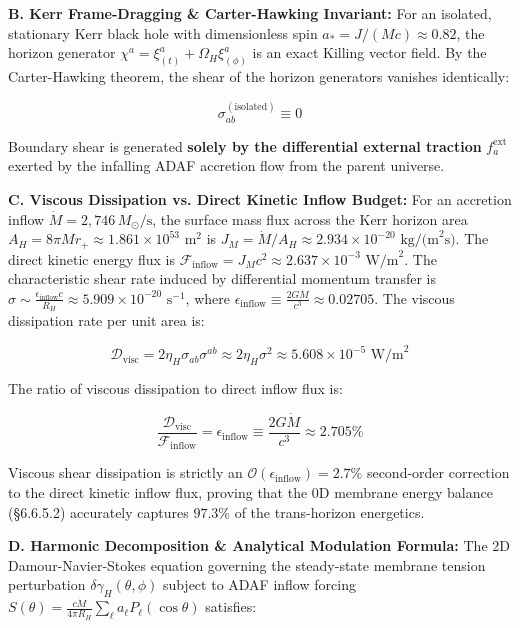 \documentclass[11pt,a4paper]{article}
\theoremstyle{definition}
\theoremstyle{remark}
\begin{document}
\textbf{B. Kerr Frame-Dragging \& Carter-Hawking Invariant:}
For an isolated, stationary Kerr black hole with dimensionless spin $a_* = J/(M c) \approx 0.82$, the horizon generator $\chi^a = \xi_{(t)}^a + \Omega_H \xi_{(\phi)}^a$ is an exact Killing vector field. By the Carter-Hawking theorem, the shear of the horizon generators vanishes identically:


\begin{equation}
\sigma_{ab}^{(\text{isolated})} \equiv 0
\end{equation}


Boundary shear is generated \textbf{solely by the differential external traction} $f_a^{\text{ext}}$ exerted by the infalling ADAF accretion flow from the parent universe.

\textbf{C. Viscous Dissipation vs. Direct Kinetic Inflow Budget:}
For an accretion inflow $\dot{M} = 2{,}746\,M_\odot/\text{s}$, the surface mass flux across the Kerr horizon area $A_H = 8\pi M r_+ \approx 1.861 \times 10^{53}\text{ m}^2$ is $J_M = \dot{M}/A_H \approx 2.934 \times 10^{-20}\text{ kg/(m}^2\text{s)}$. The direct kinetic energy flux is $\mathcal{F}_{\text{inflow}} = J_M c^2 \approx 2.637 \times 10^{-3}\text{ W/m}^2$.
The characteristic shear rate induced by differential momentum transfer is $\sigma \sim \frac{\epsilon_{\text{inflow}} c}{R_H} \approx 5.909 \times 10^{-20}\text{ s}^{-1}$, where $\epsilon_{\text{inflow}} \equiv \frac{2 G \dot{M}}{c^3} \approx 0.02705$.
The viscous dissipation rate per unit area is:


\begin{equation}
\mathcal{D}_{\text{visc}} = 2\eta_H \sigma_{ab}\sigma^{ab} \approx 2 \eta_H \sigma^2 \approx 5.608 \times 10^{-5}\text{ W/m}^2
\end{equation}


The ratio of viscous dissipation to direct inflow flux is:


\begin{equation}
\frac{\mathcal{D}_{\text{visc}}}{\mathcal{F}_{\text{inflow}}} = \epsilon_{\text{inflow}} \equiv \frac{2 G \dot{M}}{c^3} \approx 2.705\%
\end{equation}


Viscous shear dissipation is strictly an $\mathcal{O}(\epsilon_{\text{inflow}}) = 2.7\%$ second-order correction to the direct kinetic inflow flux, proving that the 0D membrane energy balance (\S 6.6.5.2) accurately captures $97.3\%$ of the trans-horizon energetics.

\textbf{D. Harmonic Decomposition \& Analytical Modulation Formula:}
The 2D Damour-Navier-Stokes equation governing the steady-state membrane tension perturbation $\delta\gamma_H(\theta, \phi)$ subject to ADAF inflow forcing $S(\theta) = \frac{c \dot{M}}{4\pi R_H} \sum_\ell a_\ell P_\ell(\cos\theta)$ satisfies:
\end{document}
